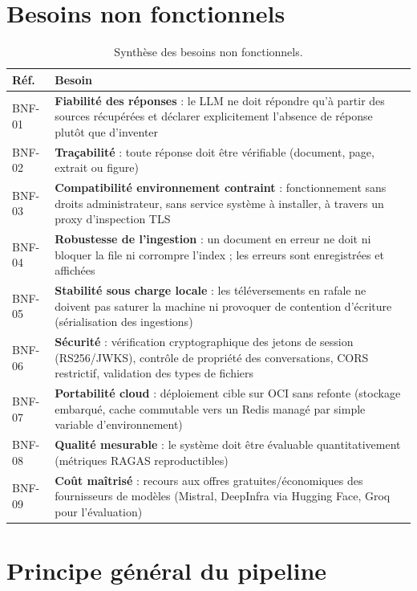 \section{Besoins non fonctionnels}
\label{sec:besoins-non-fonctionnels}

\begin{table}[!htb]
\centering\small
\caption{Synthèse des besoins non fonctionnels.}
\label{tab:bnf}
\begin{tabularx}{\textwidth}{@{}lX@{}}
\toprule
\textbf{Réf.} & \textbf{Besoin} \\
\midrule
BNF-01 & \textbf{Fiabilité des réponses} : le LLM ne doit répondre qu'à partir des sources récupérées et déclarer explicitement l'absence de réponse plutôt que d'inventer \\
BNF-02 & \textbf{Traçabilité} : toute réponse doit être vérifiable (document, page, extrait ou figure) \\
BNF-03 & \textbf{Compatibilité environnement contraint} : fonctionnement sans droits administrateur, sans service système à installer, à travers un proxy d'inspection TLS \\
BNF-04 & \textbf{Robustesse de l'ingestion} : un document en erreur ne doit ni bloquer la file ni corrompre l'index ; les erreurs sont enregistrées et affichées \\
BNF-05 & \textbf{Stabilité sous charge locale} : les téléversements en rafale ne doivent pas saturer la machine ni provoquer de contention d'écriture (sérialisation des ingestions) \\
BNF-06 & \textbf{Sécurité} : vérification cryptographique des jetons de session (RS256/JWKS), contrôle de propriété des conversations, CORS restrictif, validation des types de fichiers \\
BNF-07 & \textbf{Portabilité cloud} : déploiement cible sur OCI sans refonte (stockage embarqué, cache commutable vers un Redis managé par simple variable d'environnement) \\
BNF-08 & \textbf{Qualité mesurable} : le système doit être évaluable quantitativement (métriques RAGAS reproductibles) \\
BNF-09 & \textbf{Coût maîtrisé} : recours aux offres gratuites/économiques des fournisseurs de modèles (Mistral, DeepInfra via Hugging Face, Groq pour l'évaluation) \\
\bottomrule
\end{tabularx}
\end{table}

\section{Principe général du pipeline}
\label{sec:pipeline}

